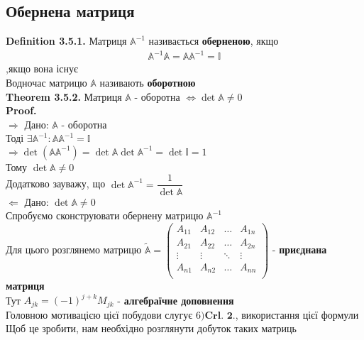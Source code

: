\documentclass[a4paper, 14pt]{extarticle}
\def\defin#1{\textbf{Definition {#1}}}
\def\th#1{\textbf{Theorem {#1}}}
\def\proof{\textbf{Proof.}\\}
\def\bigline{\vspace{5mm}\\}
\begin{document}
\subsection{Обернена матриця}
\defin{3.5.1.} Матриця $\mathbb{A}^{-1}$ називається \textbf{оберненою}, якщо
	\begin{align*}
	\mathbb{A}^{-1} \mathbb{A} = \mathbb{A} \mathbb{A}^{-1} = \mathbb{I}
	\end{align*}
,якщо вона існує\\
Водночас матрицю $\mathbb{A}$ називають \textbf{оборотною}
\bigline
\th{3.5.2.} Матриця $\mathbb{A}$ - оборотна $\iff \det \mathbb{A} \neq 0$\\
\proof
$\boxed{\Rightarrow}$ Дано: $\mathbb{A}$ - оборотна\\
Тоді $\exists \mathbb{A}^{-1}: \mathbb{A} \mathbb{A}^{-1} = \mathbb{I}$\\
$\Rightarrow \det (\mathbb{A} \mathbb{A}^{-1}) = \det \mathbb{A} \det \mathbb{A}^{-1} = \det \mathbb{I} = 1$\\
Тому $\det \mathbb{A} \neq 0$\\
Додатково зауважу, що
$\det \mathbb{A}^{-1} = \dfrac{1}{\det \mathbb{A}}$
\bigline
$\boxed{\Leftarrow}$ Дано: $\det \mathbb{A} \neq 0$\\
Спробуємо сконструювати обернену матрицю $\mathbb{A}^{-1}$\\
Для цього розглянемо матрицю $\tilde{\mathbb{A}} = \begin{pmatrix}
A_{11} & A_{12} & \dots & A_{1n} \\
A_{21} & A_{22} & \dots & A_{2n} \\
\vdots & \vdots & \ddots & \vdots \\
A_{n1} & A_{n2} & \dots & A_{nn} \\
\end{pmatrix}$ - \textbf{приєднана матриця}\\
Тут $A_{jk} = (-1)^{j+k}M_{jk}$ - \textbf{алгебраїчне доповнення}\\
Головною мотивацією цієї побудови слугує $6) \textbf{Crl. 2.}$, використання цієї формули\\
Щоб це зробити, нам необхідно розглянути добуток таких матриць\\
\end{document}
